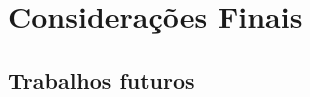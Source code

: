 \chapter{Considerações Finais}


\hspace{2.5cm}
\section{Trabalhos futuros}
\label{subsec:telas}
\hspace{2.5cm}


